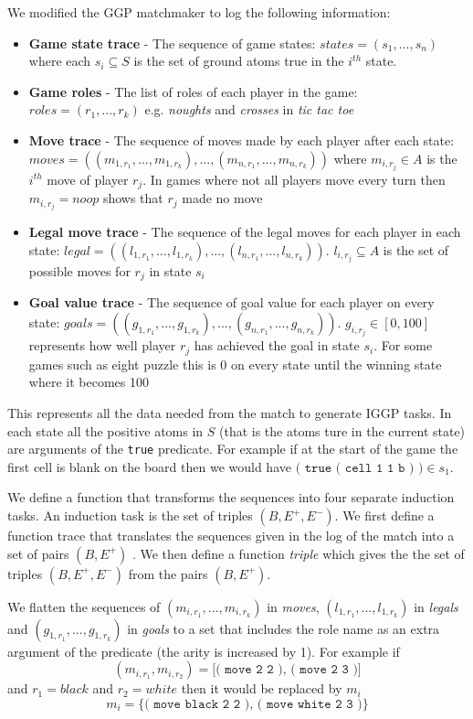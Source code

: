 We modified the GGP matchmaker to log the following information:
\begin{itemize}
	\item \textbf{Game state trace} - The sequence of game states: $states = (s_1,...,s_n)$ where each $s_i \subseteq S$ is the set of ground atoms true in the $i^{th}$ state.
	\item \textbf{Game roles} - The list of roles of each player in the game: $roles = (r_1,...,r_k)$ e.g. \textit{noughts} and \textit{crosses} in \textit{tic tac toe}
	\item \textbf{Move trace} - The sequence of moves made by each player after each state: $moves = ((m_{1,r_1},...,m_{1,r_k}),...,(m_{n,r_1},...,m_{n,r_k}))$ where $m_{i,r_j} \in A$ is the $i^{th}$ move of player $r_j$. In games where not all players move every turn then $m_{i,r_j}=noop$ shows that $r_j$ made no move
	\item \textbf{Legal move trace} - The sequence of the legal moves for each player in each state:  $legal = ((l_{1,r_1},...,l_{1,r_k}),...,(l_{n,r_1},...,l_{n,r_k}))$. $l_{i,r_j} \subseteq A$ is the set of possible moves for $r_j$ in state $s_i$
	\item \textbf{Goal value trace} - The sequence of goal value for each player on every state: $goals = ((g_{1,r_1},...,g_{1,r_k}),...,(g_{n,r_1},...,g_{n,r_k}))$. $g_{i,r_j} \in [0,100]$ represents how well player $r_j$ has achieved the goal in state $s_i$. For some games such as eight puzzle this is 0 on every state until the winning state where it becomes 100
	
\end{itemize}
This represents all the data needed from the match to generate IGGP tasks. In each state all the positive atoms in $S$ (that is the atoms ture in the current state) are arguments of the \texttt{true} predicate. For example if at the start of the game the first cell is blank on the board then we would have $\texttt{( true ( cell 1 1 b ) )} \in s_1$. 

We define a function that transforms the sequences into four separate induction tasks. An induction task is the set of triples $(B,E^+,E^-)$. We first define a function trace that translates the sequences given in the log of the match into a set of pairs $(B,E^+)$ . We then define a function \textit{triple} which gives the the set of triples  $(B,E^+,E^-)$ from the pairs $(B,E^+)$.

We flatten the sequences of $(m_{i,r_1},...,m_{i,r_k})$ in \textit{moves}, $(l_{1,r_1},...,l_{1,r_k})$ in \textit{legals} and $(g_{1,r_1},...,g_{1,r_k})$ in \textit{goals} to a set that includes the role name as an extra argument of the predicate (the arity is increased by 1). For example if \[(m_{i,r_1},m_{i,r_2}) = \texttt{[( move 2 2 ), ( move 2 3 )]}\] 
and $r_1 = black$ and $r_2 = white$ then it would be replaced by $m_i$
\[m_i = \texttt{\{( move black 2 2 ), ( move white 2 3 )\}}\]


